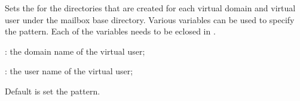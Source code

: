 
Sets the  for the directories that are created for each virtual
domain and virtual user under the mailbox base directory. 
Various variables can be used to specify the pattern.
Each of the variables needs to be eclosed in \qcode{\$\{\}}.
\begin{compactitem}
\item[\qcode{domain}:] the domain name of the virtual user;
\item[\qcode{user}:] the user name of the virtual user;
\end{compactitem}
Default is set the  pattern.
